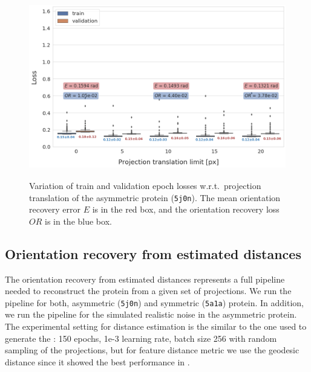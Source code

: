 \begin{figure}
    \centering
        \includegraphics[height=8cm]{images/de_translation_nums.png}
        \caption{
        Variation of train and validation epoch losses w.r.t.\ projection translation of the asymmetric protein (\texttt{5j0n}). The mean orientation recovery error $E$ is in the red box, and the orientation recovery loss $OR$ is in the blue box.
    }\label{fig:distance-estimation-vary-projection-translation}
\end{figure}


\subsection{Orientation recovery from estimated distances}


The orientation recovery from estimated distances represents a full pipeline needed to reconstruct the protein from a given set of projections. 
We run the pipeline for both, asymmetric (\texttt{5j0n}) and symmetric (\texttt{5a1a}) protein.
In addition, we run the pipeline for the simulated realistic noise in the asymmetric protein.
The experimental setting for distance estimation is the similar to the one used to generate the : 150 epochs, 1e-3 learning rate, batch size 256 with random sampling of the projections, but for feature distance metric we use the geodesic distance since it showed the best performance in . 


